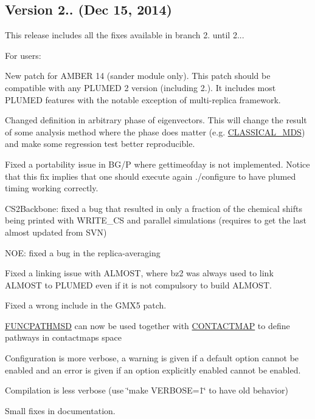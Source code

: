 \subsection*{Version 2.. (Dec 15, 2014) }

This release includes all the fixes available in branch 2. until 2...

For users\+:
\begin{DoxyItemize}
\item New patch for A\+M\+B\+E\+R 14 (sander module only). This patch should be compatible with any P\+L\+U\+M\+E\+D 2 version (including 2.). It includes most P\+L\+U\+M\+E\+D features with the notable exception of multi-\/replica framework.
\item Changed definition in arbitrary phase of eigenvectors. This will change the result of some analysis method where the phase does matter (e.\+g. \hyperlink{CLASSICAL_MDS}{C\+L\+A\+S\+S\+I\+C\+A\+L\+\_\+\+M\+D\+S}) and make some regression test better reproducible.
\item Fixed a portability issue in B\+G/\+P where gettimeofday is not implemented. Notice that this fix implies that one should execute again ./configure to have plumed timing working correctly.
\item C\+S2\+Backbone\+: fixed a bug that resulted in only a fraction of the chemical shifts being printed with W\+R\+I\+T\+E\+\_\+\+C\+S and parallel simulations (requires to get the last almost updated from S\+V\+N)
\item N\+O\+E\+: fixed a bug in the replica-\/averaging
\item Fixed a linking issue with A\+L\+M\+O\+S\+T, where bz2 was always used to link A\+L\+M\+O\+S\+T to P\+L\+U\+M\+E\+D even if it is not compulsory to build A\+L\+M\+O\+S\+T.
\item Fixed a wrong include in the G\+M\+X5 patch.
\item \hyperlink{FUNCPATHMSD}{F\+U\+N\+C\+P\+A\+T\+H\+M\+S\+D} can now be used together with \hyperlink{CONTACTMAP}{C\+O\+N\+T\+A\+C\+T\+M\+A\+P} to define pathways in contactmaps space
\item Configuration is more verbose, a warning is given if a default option cannot be enabled and an error is given if an option explicitly enabled cannot be enabled.
\item Compilation is less verbose (use \char`\"{}make V\+E\+R\+B\+O\+S\+E=1\char`\"{} to have old behavior)
\item Small fixes in documentation.
\end{DoxyItemize}

